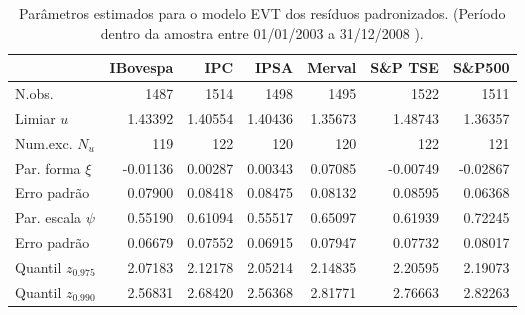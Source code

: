 \begin{table}[H]
\centering
\caption{Parâmetros estimados para o modelo EVT dos resíduos padronizados. 
               (Período dentro da amostra entre 01/01/2003 a 31/12/2008 ).} 
\label{tab:evtcoef}
\begin{tabular}{lrrrrrr}
  \hline
 & IBovespa & IPC & IPSA & Merval & S\&P TSE & S\&P500 \\ 
  \hline
N.obs. & 1487 & 1514 & 1498 & 1495 & 1522 & 1511 \\ 
  Limiar $u$ & 1.43392 & 1.40554 & 1.40436 & 1.35673 & 1.48743 & 1.36357 \\ 
  Num.exc. $N_u$ & 119 & 122 & 120 & 120 & 122 & 121 \\ 
  Par. forma $\xi$ & -0.01136 & 0.00287 & 0.00343 & 0.07085 & -0.00749 & -0.02867 \\ 
  Erro padrão & 0.07900 & 0.08418 & 0.08475 & 0.08132 & 0.08595 & 0.06368 \\ 
  Par. escala $\psi$ & 0.55190 & 0.61094 & 0.55517 & 0.65097 & 0.61939 & 0.72245 \\ 
  Erro padrão & 0.06679 & 0.07552 & 0.06915 & 0.07947 & 0.07732 & 0.08017 \\ 
  Quantil $z_{0.975}$ & 2.07183 & 2.12178 & 2.05214 & 2.14835 & 2.20595 & 2.19073 \\ 
  Quantil $z_{0.990}$ & 2.56831 & 2.68420 & 2.56368 & 2.81771 & 2.76663 & 2.82263 \\ 
   \hline
\end{tabular}
\end{table}
